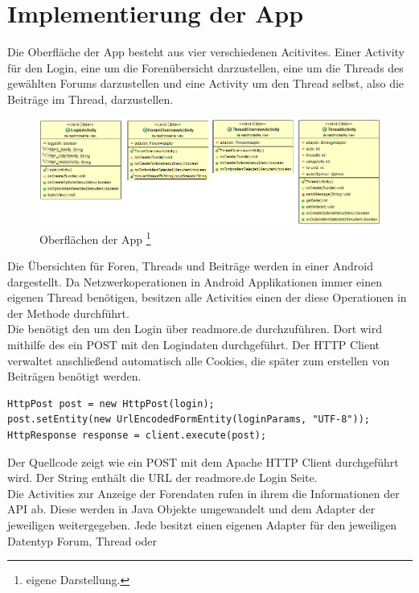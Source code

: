 \section{Implementierung der App}
Die Oberfläche der App besteht aus vier verschiedenen Acitivites. Einer Activity
für den Login, eine um die Forenübersicht darzustellen, eine um die Threads des
gewählten Forums darzustellen und eine Activity um den Thread selbst, also die
Beiträge im Thread, darzustellen. 
\begin{figure}[!htbp]
\centering
\includegraphics[width=\textwidth]{Bilder/activities.png}
\caption[Oberflächen der App]{Oberflächen der App
\protect\footnote{eigene Darstellung.} }
\label{restuml}
\end{figure}
Die Übersichten für Foren, Threads und Beiträge werden in einer Android
 dargestellt. Da Netzwerkoperationen in Android Applikationen
immer einen eigenen Thread benötigen, besitzen alle Activities einen
 der diese Operationen in der Methode
durchführt.\\
Die  benötigt den  um den Login über
readmore.de durchzuführen. Dort wird mithilfe des  ein POST mit den Logindaten durchgeführt. Der HTTP Client verwaltet
anschließend automatisch alle Cookies, die später zum erstellen von Beiträgen
benötigt werden. 
\begin{lstlisting}[caption=Durchführen des Login POST]
HttpPost post = new HttpPost(login);
post.setEntity(new UrlEncodedFormEntity(loginParams, "UTF-8"));
HttpResponse response = client.execute(post);
\end{lstlisting}
Der Quellcode zeigt wie ein POST mit dem Apache HTTP Client durchgeführt wird.
Der String  enthält die URL der readmore.de Login Seite. \\
Die Activities zur Anzeige der Forendaten rufen in ihrem  die
Informationen der API ab. Diese werden in Java Objekte umgewandelt und dem
Adapter der jeweiligen  weitergegeben. Jede 
besitzt einen eigenen Adapter für den jeweiligen Datentyp Forum, Thread oder
